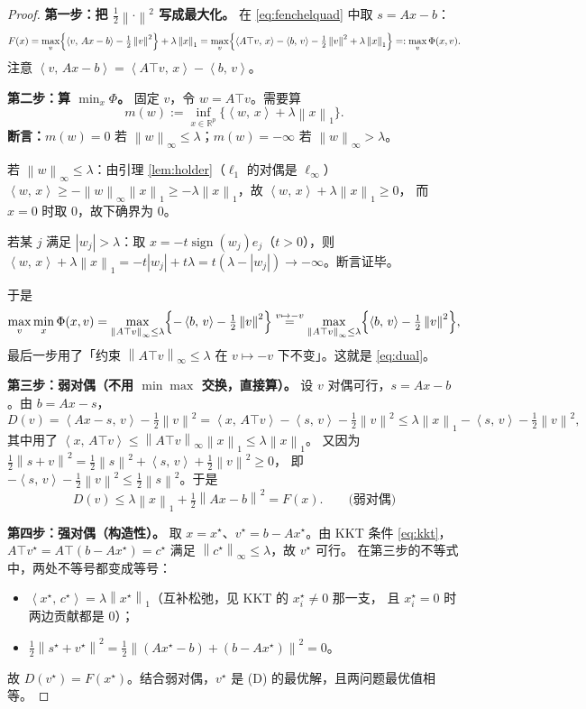 \documentclass[11pt,a4paper,UTF8]{ctexart}
\theoremstyle{plain}
\theoremstyle{definition}
\theoremstyle{remark}
\newcommand{\R}{\mathbb{R}}
\newcommand{\norm}[1]{\left\lVert #1 \right\rVert}
\newcommand{\abs}[1]{\left\lvert #1 \right\rvert}
\newcommand{\inner}[2]{\left\langle #1,\, #2 \right\rangle}
\DeclareMathOperator{\sign}{sign}
\begin{document}
\begin{proof}
\textbf{第一步：把 $\tfrac12\norm{\cdot}^2$ 写成最大化。}
在 \eqref{eq:fenchelquad} 中取 $s=Ax-b$：
\[
F(x)=\max_{v}\Bigl\{\inner{v}{Ax-b}-\tfrac12\norm v^2\Bigr\}+\lambda\norm x_1
=\max_{v}\Bigl\{\inner{A\top v}{x}-\inner{b}{v}-\tfrac12\norm v^2+\lambda\norm x_1\Bigr\}
=:\max_v\Phi(x,v).
\]
注意 $\inner{v}{Ax-b}=\inner{A\top v}{x}-\inner{b}{v}$。

\textbf{第二步：算 $\min_x\Phi$。}
固定 $v$，令 $w=A\top v$。需要算
\[
m(w):=\inf_{x\in\R^p}\bigl\{\inner{w}{x}+\lambda\norm x_1\bigr\}.
\]
\textbf{断言：}$m(w)=0$ 若 $\norm w_\infty\le\lambda$；$m(w)=-\infty$ 若 $\norm w_\infty>\lambda$。

若 $\norm w_\infty\le\lambda$：由引理 \ref{lem:holder}（$\ell_1$ 的对偶是 $\ell_\infty$）
$\inner w x\ge-\norm w_\infty\norm x_1\ge-\lambda\norm x_1$，故 $\inner wx+\lambda\norm x_1\ge0$，
而 $x=0$ 时取 $0$，故下确界为 $0$。

若某 $j$ 满足 $\abs{w_j}>\lambda$：取 $x=-t\sign(w_j)e_j$（$t>0$），则
$\inner wx+\lambda\norm x_1=-t\abs{w_j}+t\lambda=t(\lambda-\abs{w_j})\to-\infty$。断言证毕。

于是
\[
\max_v\min_x\Phi(x,v)=\max_{\norm{A\top v}_\infty\le\lambda}\Bigl\{-\inner b v-\tfrac12\norm v^2\Bigr\}
\overset{v\mapsto -v}{=}\max_{\norm{A\top v}_\infty\le\lambda}\Bigl\{\inner b v-\tfrac12\norm v^2\Bigr\},
\]
最后一步用了「约束 $\norm{A\top v}_\infty\le\lambda$ 在 $v\mapsto-v$ 下不变」。这就是 \eqref{eq:dual}。

\textbf{第三步：弱对偶（不用 $\min\max$ 交换，直接算）。}
设 $v$ 对偶可行，$s=Ax-b$。由 $b=Ax-s$，
\[
D(v)=\inner{Ax-s}{v}-\tfrac12\norm v^2=\inner{x}{A\top v}-\inner sv-\tfrac12\norm v^2
\le\lambda\norm x_1-\inner sv-\tfrac12\norm v^2,
\]
其中用了 $\inner{x}{A\top v}\le\norm{A\top v}_\infty\norm x_1\le\lambda\norm x_1$。
又因为 $\tfrac12\norm{s+v}^2=\tfrac12\norm s^2+\inner sv+\tfrac12\norm v^2\ge0$，
即 $-\inner sv-\tfrac12\norm v^2\le\tfrac12\norm s^2$。于是
\[
D(v)\le\lambda\norm x_1+\tfrac12\norm{Ax-b}^2=F(x). \qquad\text{(弱对偶)}
\]

\textbf{第四步：强对偶（构造性）。}
取 $x=x^\star$、$v^\star=b-Ax^\star$。由 KKT 条件 \eqref{eq:kkt}，
$A\top v^\star=A\top(b-Ax^\star)=c^\star$ 满足 $\norm{c^\star}_\infty\le\lambda$，故 $v^\star$ 可行。
在第三步的不等式中，两处不等号都变成等号：
\begin{itemize}
\item $\inner{x^\star}{c^\star}=\lambda\norm{x^\star}_1$（互补松弛，见 KKT 的 $x_i^\star\neq0$ 那一支，
      且 $x_i^\star=0$ 时两边贡献都是 $0$）；
\item $\tfrac12\norm{s^\star+v^\star}^2=\tfrac12\norm{(Ax^\star-b)+(b-Ax^\star)}^2=0$。
\end{itemize}
故 $D(v^\star)=F(x^\star)$。结合弱对偶，$v^\star$ 是 (D) 的最优解，且两问题最优值相等。
\end{proof}
\end{document}
